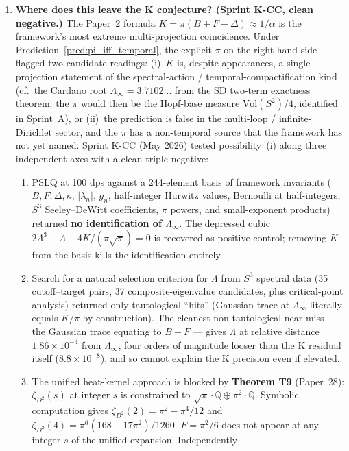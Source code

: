 \documentclass[11pt]{article}
\begin{document}
\begin{enumerate}
\item \textbf{Where does this leave the K conjecture? (Sprint K-CC,
clean negative.)}  The Paper~2 formula
$K = \pi(B + F - \Delta) \approx 1/\alpha$ is the framework's most
extreme multi-projection coincidence.  Under
Prediction~\ref{pred:pi_iff_temporal}, the explicit $\pi$ on the
right-hand side flagged two candidate readings: (i)~$K$ is, despite
appearances, a single-projection statement of the spectral-action /
temporal-compactification kind (cf.~the Cardano root $\Lambda_\infty
= 3.7102\ldots$ from the SD two-term exactness theorem; the $\pi$
would then be the Hopf-base measure $\mathrm{Vol}(S^2)/4$, identified
in Sprint~A), or (ii)~the prediction is false in the multi-loop /
infinite-Dirichlet sector, and the $\pi$ has a non-temporal source
that the framework has not yet named.  Sprint K-CC (May 2026) tested
possibility~(i) along three independent axes with a clean triple
negative:
\begin{enumerate}\setlength\itemsep{0pt}
\item PSLQ at 100 dps against a 244-element basis of framework
invariants ($B, F, \Delta, \kappa$, $|\lambda_n|$, $g_n$, half-integer
Hurwitz values, Bernoulli at half-integers, $S^3$ Seeley--DeWitt
coefficients, $\pi$ powers, and small-exponent products) returned
\textbf{no identification of $\Lambda_\infty$}.  The depressed cubic
$2\Lambda^3 - \Lambda - 4K/(\pi\sqrt{\pi}) = 0$ is recovered as
positive control; removing $K$ from the basis kills the
identification entirely.
\item Search for a natural selection criterion for $\Lambda$ from
$S^3$ spectral data (35 cutoff--target pairs, 37 composite-eigenvalue
candidates, plus critical-point analysis) returned only tautological
``hits'' (Gaussian trace at $\Lambda_\infty$ literally equals $K/\pi$
by construction).  The cleanest non-tautological near-miss --- the
Gaussian trace equating to $B + F$ --- gives $\Lambda$ at relative
distance $1.86\times 10^{-4}$ from $\Lambda_\infty$, four orders of
magnitude looser than the K residual itself ($8.8\times 10^{-8}$),
and so cannot explain the K precision even if elevated.
\item The unified heat-kernel approach is blocked by
\textbf{Theorem T9} (Paper~28): $\zeta_{D^2}(s)$ at integer $s$ is
constrained to $\sqrt{\pi}\cdot\mathbb{Q} \oplus \pi^2 \cdot \mathbb{Q}$.
Symbolic computation gives $\zeta_{D^2}(2) = \pi^2 - \pi^4/12$ and
$\zeta_{D^2}(4) = \pi^6(168 - 17\pi^2)/1260$.  $F = \pi^2/6$ does not
appear at any integer $s$ of the unified expansion.  Independently

\end{enumerate}
\end{enumerate}
\end{document}
